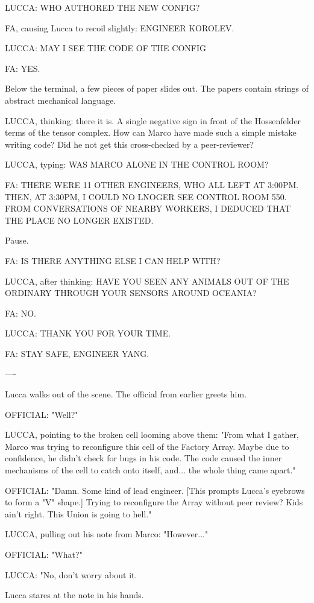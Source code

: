 \documentclass[11pt]{article}
\begin{document}
LUCCA: WHO AUTHORED THE NEW CONFIG?

FA, causing Lucca to recoil slightly: ENGINEER KOROLEV. 

LUCCA: MAY I SEE THE CODE OF THE CONFIG

FA: YES. 

Below the terminal, a few pieces of paper slides out. 
The papers contain strings of abstract mechanical language. 

LUCCA, thinking: there it is. 
A single negative sign in front of the Hossenfelder terms of the tensor complex. 
How can Marco have made such a simple mistake writing code? 
Did he not get this cross-checked by a peer-reviewer?

LUCCA, typing: WAS MARCO ALONE IN THE CONTROL ROOM?

FA: THERE WERE 11 OTHER ENGINEERS, WHO ALL LEFT AT 3:00PM. 
THEN, AT 3:30PM, I COULD NO LNOGER SEE CONTROL ROOM 550. 
FROM CONVERSATIONS OF NEARBY WORKERS, I DEDUCED THAT THE PLACE NO LONGER EXISTED. 

Pause.

FA: IS THERE ANYTHING ELSE I CAN HELP WITH?

LUCCA, after thinking: HAVE YOU SEEN ANY ANIMALS OUT OF THE ORDINARY THROUGH YOUR SENSORS AROUND OCEANIA?

FA: NO.

LUCCA: THANK YOU FOR YOUR TIME.

FA: STAY SAFE, ENGINEER YANG.

----

Lucca walks out of the scene. The official from earlier greets him. 

OFFICIAL: "Well?"

LUCCA, pointing to the broken cell looming above them: "From what I gather, Marco was trying to reconfigure this cell of the Factory Array. 
Maybe due to confidence, he didn't check for bugs in his code. The code caused the inner mechanisms of the cell to catch onto itself, and...
the whole thing came apart."

OFFICIAL: "Damn. Some kind of lead engineer. [This prompts Lucca's eyebrows to form a "V" shape.] 
Trying to reconfigure the Array without peer review? Kids ain't right. This Union is going to hell."

LUCCA, pulling out his note from Marco: "However..."

OFFICIAL: "What?"

LUCCA: "No, don't worry about it. 

Lucca stares at the note in his hands. 
\end{document}
